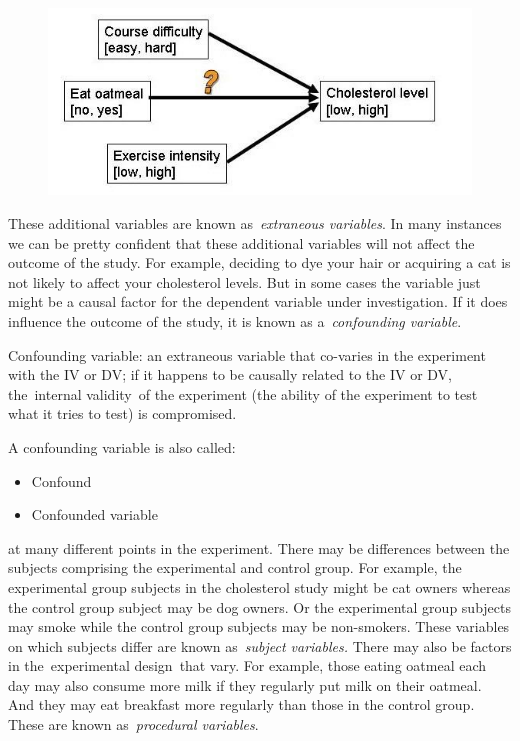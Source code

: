 \begin{refsection}
\begin{figure}[htbp]
\centering
\includegraphics[keepaspectratio,width=\textwidth,height=0.75\textheight]{cholesterolcausaldiagram.jpg}
\label{cholesterolcausaldiagram.jpg}
\end{figure}

These additional variables are known as \emph{extraneous variables}. In many instances we can be pretty confident that these additional variables will not affect the outcome of the study. For example, deciding to dye your hair or acquiring a cat is not likely to affect your cholesterol levels. But in some cases the variable just might be a causal factor for the dependent variable under investigation. If it does influence the outcome of the study, it is known as a \emph{confounding variable}.

\begin{thesis}\label{thesis:confoundingvariables}Confounding variable: an extraneous variable that co-varies in the experiment with the IV or DV; if it happens to be causally related to the IV or DV, the internal validity of the experiment (the ability of the experiment to test what it tries to test) is compromised.

A confounding variable is also called:

\begin{itemize}
\item Confound

\item Confounded variable

\end{itemize}

\end{thesis}

 at many different points in the experiment. There may be differences between the subjects comprising the experimental and control group. For example, the experimental group subjects in the cholesterol study might be cat owners whereas the control group subject may be dog owners. Or the experimental group subjects may smoke while the control group subjects may be non-smokers. These variables on which subjects differ are known as \emph{subject variables.}
There may also be factors in the experimental design that vary. For example, those eating oatmeal each day may also consume more milk if they regularly put milk on their oatmeal. And they may eat breakfast more regularly than those in the control group. These are known as \emph{procedural variables}.


\end{refsection}
